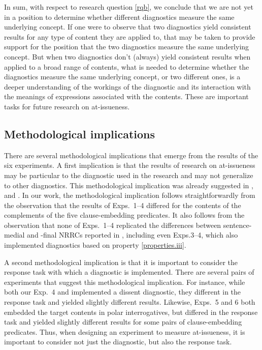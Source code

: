 \documentclass[times,linguex]{glossa}
\begin{document}
In sum, with respect to research question \ref{rqb}, we conclude that we are not yet in a position to determine whether different diagnostics measure the same underlying concept. If one were to observe that two diagnostics yield consistent results for any type of content they are applied to, that may be taken to provide support for the position that the two diagnostics measure the same underlying concept. But when two diagnostics don't (always) yield consistent results when applied to a broad range of contents, what is needed to determine whether the diagnostics measure the same underlying concept, or two different ones, is a deeper understanding of the workings of the diagnostic and its interaction with the meanings of expressions associated with the contents. These are important tasks for future research on at-issueness.

\subsection{Methodological implications \label{ssec:discussion-methods}}

There are several methodological implications that emerge from the results of the six experiments. A first implication is that the results of research on at-issueness may be particular to the diagnostic used in the research and may not generalize to other diagnostics. This methodological implication was already suggested in \citealt{snider_at-issueness_2017,snider_anaphoric_2017,snider_distinguishing_2018}, \citealt{koev_notions_2018} and \citealt{korotkova_evidential_2020}. In our work, the methodological implication follows straightforwardly from the observation that the results of Exps.~1--4 differed for the contents of the complements of the five clause-embedding predicates. It also follows from the observation that none of Exps.~1--4 replicated the differences between sentence-medial and -final NRRCs reported in \citealt{syrett_experimental_2015}, including even Exps.3--4, which also implemented diagnostics based on property \ref{properties.iii}.

A second methodological implication is that it is important to consider the response task with  which a diagnostic is implemented. There are several pairs of experiments that suggest this methodological implication. For instance, while both our Exp.~4 and \citealt[Exp.~2]{syrett_experimental_2015} implemented a dissent diagnostic, they different in the response task and yielded slightly different results. Likewise, Exps.~5 and 6 both embedded the target contents in polar interrogatives, but differed in the response task and yielded slightly different results for some pairs of clause-embedding predicates. Thus, when designing an experiment to measure at-issueness, it is important to consider not just the diagnostic, but also the response task.
\end{document}
